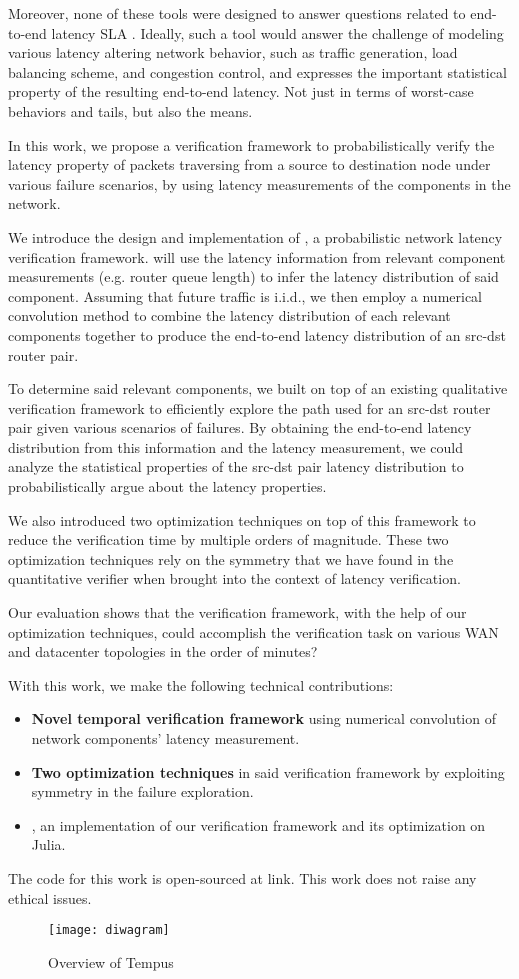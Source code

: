 Moreover, none of these tools were designed to answer questions related to end-to-end latency SLA \cite{Verizon}.
Ideally, such a tool would answer the challenge of modeling various latency altering network behavior, 
such as traffic generation, load balancing scheme, and congestion control, and expresses the important 
statistical property of the resulting end-to-end latency.
Not just in terms of worst-case behaviors and tails, but also the means.

In this work, we propose a verification framework to probabilistically verify the latency property of packets 
traversing from a source to destination node under various failure scenarios, by using latency 
measurements of the components in the network.

We introduce the design and implementation of \tool, a probabilistic network latency verification 
framework.
\tool will use the latency information from relevant component measurements (e.g. router queue length) 
to infer the latency distribution of said component.
Assuming that future traffic is i.i.d., we then employ a numerical convolution method to combine the
latency distribution of each relevant components together to produce the end-to-end latency distribution 
of an src-dst router pair. 

To determine said relevant components, we built \tool on top of an existing qualitative verification 
framework to efficiently explore the path used for an src-dst router pair given various scenarios of 
failures.
By obtaining the end-to-end latency distribution from this information and the latency measurement, 
we could analyze the statistical properties of the src-dst pair latency distribution to probabilistically 
argue about the latency properties.

We also introduced two optimization techniques on top of this framework to reduce the verification time 
by multiple orders of magnitude.
These two optimization techniques rely on the symmetry that we have found in the quantitative verifier 
when brought into the context of latency verification.

Our evaluation shows that the verification framework, with the help of our optimization techniques, 
could accomplish the verification task on various WAN and datacenter topologies in the order of 
minutes?

With this work, we make the following technical contributions:
\begin{itemize}
    \item \textbf{Novel temporal verification framework} using numerical convolution of network 
        components' latency measurement.
    \item \textbf{Two optimization techniques} in said verification framework by exploiting 
        symmetry in the failure exploration.
    \item \textbf{\tool}, an implementation of our verification framework and its optimization 
        on Julia.
\end{itemize}

The code for this work is open-sourced at link. %
This work does not raise any ethical issues.

\begin{figure*}[h]
    \centering
    \texttt{[image: diwagram]}
    \caption{Overview of Tempus}
    \label{fig:process}
\end{figure*}